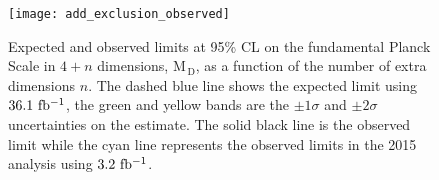 \begin{figure}[!htb]
  \centering
  \texttt{[image: add\_exclusion\_observed]}
  \caption{Expected and observed limits at 95\% CL on the fundamental Planck
    Scale in $4 + n$ dimensions, M$_\mathrm{\, D}$, as a function of the number
    of extra dimensions $n$. The dashed blue line shows the expected limit using
    $36.1~\mbox{fb$^{-1}$}$, the green and yellow bands are the $\pm 1 \sigma$ and
    $\pm 2 \sigma$ uncertainties on the estimate. The solid black line is the
    observed limit while the cyan line represents the observed limits in the
    2015 analysis using $3.2~\mbox{fb$^{-1}$}$.}
  \label{fig:add_observed}
\end{figure}
